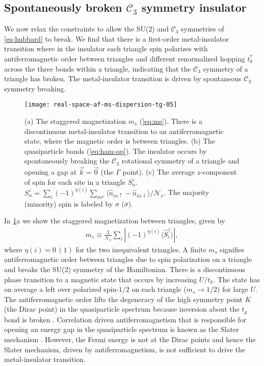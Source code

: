 \documentclass[reprint,aps,prb,amsmath,amssymb]{revtex4-2}
\begin{document}
\subsection{Spontaneously broken $\mathcal{C}_3$ symmetry insulator}
\label{sec:broken-c3}

We now relax the constraints to allow the SU(2) and $\mathcal{C}_3$ symmetries of \cref{eq:hubbard} to break. We find that there is a first-order metal-insulator transition where in the insulator each triangle spin polarizes with antiferromagnetic order between triangles and different renormalized hopping $t_k^*$ across the three bonds within a triangle, indicating that the $\mathcal{C}_3$ symmetry of a triangle has broken. The metal-insulator transition is driven by spontaneous $\mathcal{C}_3$ symmetry breaking.

\begin{figure}
	\centering
	\texttt{[image: real-space-af-ms-dispersion-tg-05]}
	\caption
	{\label{fig:afm-sz-bands}
		(a) The staggered magnetization $m_s$ (\cref{eq:ms}). There is a discontinuous metal-insulator transition to an antiferromagnetic state, where the magnetic order is between triangles.
		(b) The quasiparticle bands (\cref{eq:ham-qp}).
		The insulator occurs by spontaneously breaking the $\mathcal{C}_3$ rotational symmetry of a triangle and opening a gap at $\vec{k} = \vec{0}$ (the $\Gamma$ point).
		(c) The average $z$-component of spin for each site in a triangle $S_{\alpha}^z$.
		$S_{\alpha}^z = \sum_i (-1)^{\eta(i)} \sum_{\sigma\sigma'} \langle \hat{n}_{i\alpha\uparrow} - \hat{n}_{i\alpha\downarrow} \rangle / \mathcal{N}_{\nu}$.
		The majority (minority) spin is labeled by $\sigma$ ($\bar{\sigma}$).
	}
\end{figure}

In \cref{fig:afm-sz-bands}a we show the staggered magnetization between triangles, given by
%
\begin{align} \label{eq:ms}
m_s \equiv \frac{3}{\mathcal{N}_{\nu}} \sum_i \left| (-1)^{\eta(i)} \langle \hat{S}_i^z \rangle \right|,
\end{align}
%
where $\eta(i) = 0\,(1)$ for the two inequivalent triangles. A finite $m_s$ signifies antiferromagnetic order between triangles due to spin polarization on a triangle and breaks the SU(2) symmetry of the Hamiltonian. There is a discontinuous phase transition to a magnetic state that occurs by increasing $U/t_k$. The state has on average a left over polarized spin-$1/2$ on each triangle ($m_s \rightarrow 1/2$) for large $U$. The antiferromagnetic order lifts the degeneracy of the high symmetry point $K$ (the Dirac point) in the quasiparticle spectrum because inversion about the $t_g$ bond is broken \cite{Nourse2021b}. Correlation driven antiferromagnetism that is responsible for opening an energy gap in the quasiparticle spectrum is known as the Slater mechanism \cite{Slater1951}. However, the Fermi energy is not at the Dirac points and hence the Slater mechanism, driven by antiferromagnetism, is not sufficient to drive the metal-insulator transition.
\end{document}
